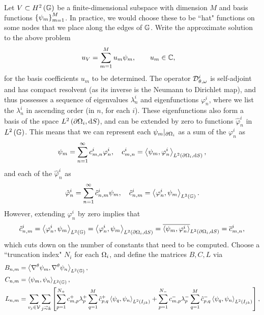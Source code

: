 \documentclass[11pt]{report}
\newcommand{\DtN}{\mathcal{D}}
\newcommand{\di}{\DtN_{\qm, \omega}^i}
\newcommand{\gradgradSob}[1]{H^2\bracs{#1}}
\begin{document}
Let $V\subset\gradgradSob{\graph}$ be a finite-dimensional subspace with dimension $M$ and basis functions $\left\{ \psi_m \right\}_{m=1}^{M}$.
In practice, we would choose these to be ``hat" functions on some nodes that we place along the edges of $\mathbb{G}$.
Write the approximate solution to the above problem
\begin{align*}
	u_V &= \sum_{m=1}^M u_m\psi_m, \qquad u_m\in\mathbb{C},
\end{align*}
for the basis coefficients $u_m$ to be determined.
The operator $\di$ is self-adjoint and has compact resolvent (as its inverse is the Neumann to Dirichlet map), and thus possesses a sequence of eigenvalues $\lambda^i_n$ and eigenfunctions $\varphi_n^i$, where we list the $\lambda^i_n$ in ascending order (in $n$, for each $i$).
These eigenfunctions also form a basis of the space $L^{2}\left( \partial\Omega_i,\mathrm{d}S \right)$, and can be extended by zero to functions $\hat{\varphi}_n^i$ in $L^2\left( \mathbb{G} \right)$.
This means that we can represent each $\psi_m\vert_{\partial\Omega_i}$ as a sum of the $\varphi_n^i$ as
\begin{align*}
	\psi_m = \sum_{n=1}^{\infty} c_{m,n}^i \varphi_n^i, \quad c_{m,n}^i = \left\langle \psi_m , \varphi_n^i \right\rangle_{L^{2}\left( \partial\Omega_i,\mathrm{d}S \right)},
\end{align*}
and each of the $\hat{\varphi}_n^i$ as
\begin{align*}
	\hat{\varphi}_n^i = \sum_{n=1}^{\infty} \hat{c}_{n,m}^i \psi_m, \quad \hat{c}_{n,m}^i = \left\langle \varphi_n^i , \psi_m \right\rangle_{L^2\left( \mathbb{G} \right)}.
\end{align*}
However, extending $\varphi_n^i$ by zero implies that
\begin{align*}
	\hat{c}_{n,m}^i = \left\langle \varphi_n^i , \psi_m \right\rangle_{L^2\left( \mathbb{G} \right)} = \left\langle \varphi_n^i , \psi_m \right\rangle_{L^{2}\left( \partial\Omega_i,\mathrm{d}S \right)} = \overline{\left\langle \psi_m , \varphi_n^i \right\rangle}_{L^{2}\left( \partial\Omega_i,\mathrm{d}S \right)} = \overline{c}_{m,n}^i,
\end{align*}
which cuts down on the number of constants that need to be computed.
Choose a ``truncation index" $N_i$ for each $\Omega_i$, and define the matrices $B, C, L$ via
\begin{align*}
	B_{n,m} &= \ip{\tgrad\psi_m}{\tgrad\psi_n}_{L^2\bracs{\graph}}, \\
	C_{n,m} &= \ip{\psi_m}{\psi_n}_{L^2\bracs{\graph}}, \\
	L_{n,m} &= \sum_{v_j\in\vertSet}\sum_{j\conLeft k}
	\sqbracs{ \sum_{p=1}^{N_+}c_{m,p}^+\lambda^+_p \sum_{q=1}^M \hat{c}_{p,q}^+ \ip{\psi_q}{\psi_n}_{L^2\bracs{I_{jk}}} + \sum_{p=1}^{N_-}c_{m,p}^-\lambda^-_p \sum_{q=1}^M \hat{c}_{p,q}^- \ip{\psi_q}{\psi_n}_{L^2\bracs{I_{jk}}} },
\end{align*}
\end{document}
